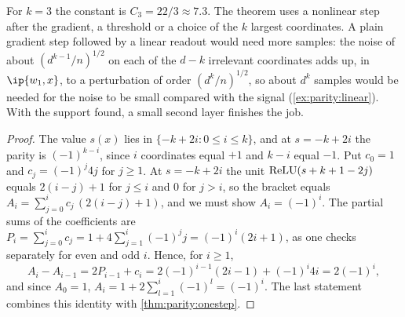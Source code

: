 \begin{refsection}
For $k=3$ the constant is $C_3=22/3\approx7.3$. The theorem uses a nonlinear step after the gradient, a threshold or a choice of the $k$ largest coordinates. A plain gradient step followed by a linear readout would need more samples: the noise of about $(d^{k-1}/n)^{1/2}$ on each of the $d-k$ irrelevant coordinates adds up, in $\ip{w_1,x}$, to a perturbation of order $(d^k/n)^{1/2}$, so about $d^k$ samples would be needed for the noise to be small compared with the signal (\cref{ex:parity:linear}). With the support found, a small second layer finishes the job.


\begin{proof}
The value $s(x)$ lies in $\{-k+2i:0\le i\le k\}$, and at $s=-k+2i$ the parity is $(-1)^{k-i}$, since $i$ coordinates equal $+1$ and $k-i$ equal $-1$. Put $c_0=1$ and $c_j=(-1)^j4j$ for $j\ge1$. At $s=-k+2i$ the unit $\operatorname{ReLU}(s+k+1-2j)$ equals $2(i-j)+1$ for $j\le i$ and $0$ for $j>i$, so the bracket equals $A_i=\sum_{j=0}^ic_j\,(2(i-j)+1)$, and we must show $A_i=(-1)^i$. The partial sums of the coefficients are $P_i=\sum_{j=0}^ic_j=1+4\sum_{j=1}^i(-1)^jj=(-1)^i(2i+1)$, as one checks separately for even and odd $i$. Hence, for $i\ge1$,
\[
  A_i-A_{i-1}=2P_{i-1}+c_i=2(-1)^{i-1}(2i-1)+(-1)^i4i=2(-1)^i,
\]
and since $A_0=1$, $A_i=1+2\sum_{l=1}^i(-1)^l=(-1)^i$. The last statement combines this identity with \cref{thm:parity:onestep}.
\end{proof}


\end{refsection}
